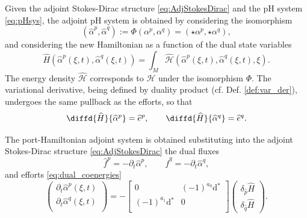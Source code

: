 \documentclass{elsarticle}
\renewcommand\d{\ensuremath{\mathrm{d}}}
\newcommand*{\dual}[1]{\ensuremath{\widehat{#1}}}
\begin{document}
Given the adjoint Stokes-Dirac structure \eqref{eq:AdjStokesDirac} and the pH system \eqref{eq:pHsys}, the adjoint pH system is obtained by considering the isomorphism
\[ (\dual{\alpha}^p,\dual{\alpha}^q) := \Phi(\alpha^p,\alpha^q) = (\star \alpha^p, \star \alpha^q) ,\]
and considering the new Hamiltonian as a function of the dual state variables
\begin{equation}
   \dual{H}(\dual{\alpha}^p(\xi, t), \dual{\alpha}^q(\xi, t)) = 
\int_M   \dual{\mathcal{H}}(\dual{\alpha}^p(\xi, t), \dual{\alpha}^q(\xi, t), \xi).
\end{equation}
The energy density $\dual{\mathcal{H}}$ corresponds to $\mathcal{H}$ under the isomorphism $\Phi$. The variational derivative, being defined by duality product (cf. Def. \ref{def:var_der}), undergoes the same pullback as the efforts, so that
\begin{equation}\label{eq:dual_coenergies}
    \diffd{\dual{H}}{\dual{\alpha}^p} = \dual{e}^p, \qquad  \diffd{\dual{H}}{\dual{\alpha}^q} = \dual{e}^q.
\end{equation}

The port-Hamiltonian adjoint system is obtained substituting into the adjoint Stokes-Dirac structure \eqref{eq:AdjStokesDirac} the dual fluxes 
\begin{equation}\label{eq:dual_flows}
\dual{f}^p = - \partial_t \dual{\alpha}^p, \qquad \dual{f}^q = - \partial_t \dual{\alpha}^q,   
\end{equation}
and efforts \eqref{eq:dual_coenergies}
\begin{equation}\label{eq:AdjPHsys}
    \begin{pmatrix}
        \partial_t \dual{\alpha}^p(\xi, t) \\
        \partial_t \dual{\alpha}^q(\xi, t) \\
    \end{pmatrix} = -
    \begin{bmatrix}
        0 &  (-1)^{a_0}\d{}^* \\
        (-1)^{a_1}\d{}^* & 0 \\
    \end{bmatrix}
    \begin{pmatrix}
        \delta_{\dual{p}} \dual{H} \\
        \delta_{\dual{q}} \dual{H}
    \end{pmatrix}.
\end{equation}
\end{document}
